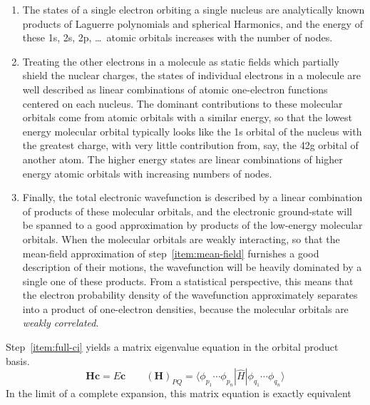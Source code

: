 \begin{enumerate}
    \item
        \label{item:atomic-orbitals}
        The states of a single electron orbiting a single nucleus are
        analytically known products of Laguerre polynomials and spherical
        Harmonics, and the energy of these 1s, 2s, 2p, \dots\ atomic orbitals
        increases with the number of nodes.
    \item
        \label{item:mean-field}
        Treating the other electrons in a molecule as static fields which
        partially shield the nuclear charges, the states of individual electrons
        in a molecule are well described as linear combinations of atomic
        one-electron functions centered on each nucleus.
        The dominant contributions to these molecular orbitals come from atomic
        orbitals with a similar energy, so that the lowest energy molecular
        orbital typically looks like the 1s orbital of the nucleus with the
        greatest charge, with very little contribution from, say, the 42g
        orbital of another atom.
        The higher energy states are linear combinations of higher energy atomic
        orbitals with increasing numbers of nodes.
    \item
        \label{item:full-ci}
        Finally, the total electronic wavefunction is described by a linear
        combination of products of these molecular orbitals, and the electronic
        ground-state will be spanned to a good approximation by products of the
        low-energy molecular orbitals.
        When the molecular orbitals are weakly interacting, so that the
        mean-field approximation of step~\ref{item:mean-field} furnishes a good
        description of their motions, the wavefunction will be heavily dominated
        by a single one of these products.
        From a statistical perspective, this means that the electron probability
        density of the wavefunction approximately separates into a product of
        one-electron densities, because the molecular orbitals are {\itshape
        weakly correlated}.
\end{enumerate}
Step~\ref{item:full-ci} yields a matrix eigenvalue equation in the orbital
product basis.
\begin{equation}
    \mathbf{H}\mathbf{c}
    =
    E\mathbf{c}
    \qquad
    (\mathbf{H})_{PQ}
    =
    \langle \phi_{p_1}\cdots \phi_{p_n}|
    \hat{H}
    |\phi_{q_1}\cdots \phi_{q_n} \rangle
\end{equation}
In the limit of a complete expansion, this matrix equation is exactly equivalent
